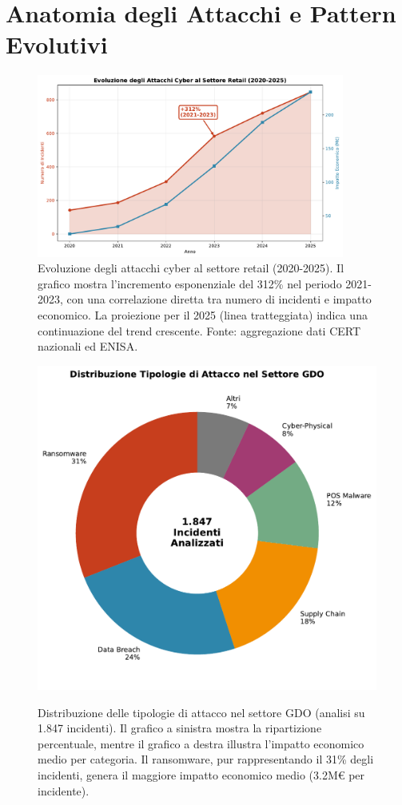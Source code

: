 \section{Anatomia degli Attacchi e Pattern Evolutivi}
\begin{figure}[htbp]
\centering
\includegraphics[width=0.9\textwidth]{thesis_figures/cap2/fig_2_1_cyber_evolution.pdf}
\caption{Evoluzione degli attacchi cyber al settore retail (2020-2025). Il grafico mostra l'incremento esponenziale del 312\% nel periodo 2021-2023, con una correlazione diretta tra numero di incidenti e impatto economico. La proiezione per il 2025 (linea tratteggiata) indica una continuazione del trend crescente. Fonte: aggregazione dati CERT nazionali ed ENISA.}
\label{fig:cyber_evolution}
\end{figure}
\begin{figure}[htbp]
\centering
\includegraphics[width=\textwidth]{thesis_figures/cap2/fig_2_2_attack_types.pdf}
\caption{Distribuzione delle tipologie di attacco nel settore GDO (analisi su 1.847 incidenti). Il grafico a sinistra mostra la ripartizione percentuale, mentre il grafico a destra illustra l'impatto economico medio per categoria. Il ransomware, pur rappresentando il 31\% degli incidenti, genera il maggiore impatto economico medio (3.2M€ per incidente).}\autocite{CPR2025}
\label{fig:attack_types}
\end{figure}
